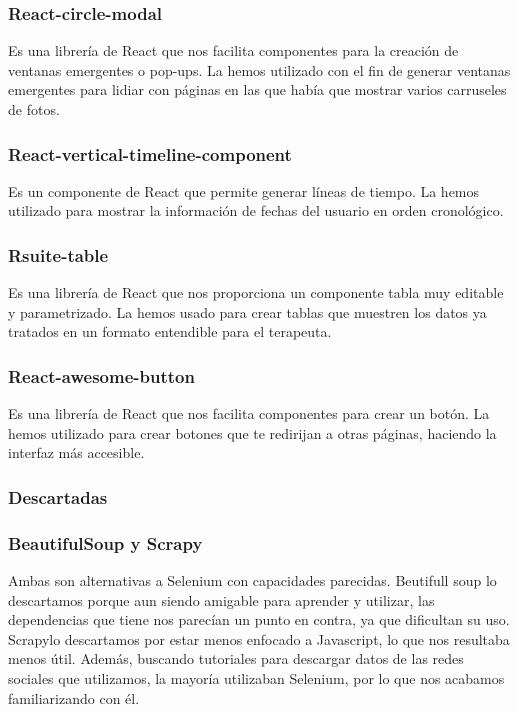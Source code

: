  		  \subsubsection*{React-circle-modal}
 		  	Es una librería de React que nos facilita componentes para la creación de ventanas emergentes o pop-ups. La hemos utilizado con el fin de generar ventanas emergentes para lidiar con páginas en las que había que mostrar varios carruseles de fotos.
 		  
 		  \subsubsection*{React-vertical-timeline-component}
 		  	Es un componente de React que permite generar líneas de tiempo.
 		  	La hemos utilizado para mostrar la información de fechas del usuario en orden cronológico.
 		  
 		  \subsubsection*{Rsuite-table}
 		  	Es una librería de React que nos proporciona un componente tabla muy editable y parametrizado. La hemos usado para crear tablas que muestren los datos ya tratados en un formato entendible para el terapeuta.
 		  
 		  \subsubsection*{React-awesome-button}
 		  	Es una librería de React que nos facilita componentes para crear un botón.
 		  	La hemos utilizado para crear botones que te redirijan a otras páginas, haciendo la interfaz más accesible.
 		  	
 		  	
 		\subsubsection{Descartadas}	
			
			\subsubsection*{BeautifulSoup y Scrapy}
			Ambas son alternativas a Selenium con capacidades parecidas. Beutifull soup lo descartamos porque aun siendo amigable para aprender y utilizar, las dependencias que tiene nos parecían un punto en contra, ya que dificultan su uso. Scrapylo descartamos por estar menos enfocado a Javascript,  lo que nos resultaba menos útil. Además, buscando tutoriales para descargar datos de las redes sociales que utilizamos, la mayoría utilizaban Selenium, por lo que nos acabamos familiarizando con él. 
			

